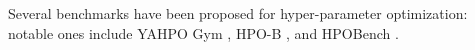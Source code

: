 
Several benchmarks have been proposed for hyper-parameter optimization: notable ones include YAHPO Gym \cite{pfisterer2022yahpo}, HPO-B \cite{arango2021hpo}, and HPOBench \cite{eggensperger2021hpobench}.

